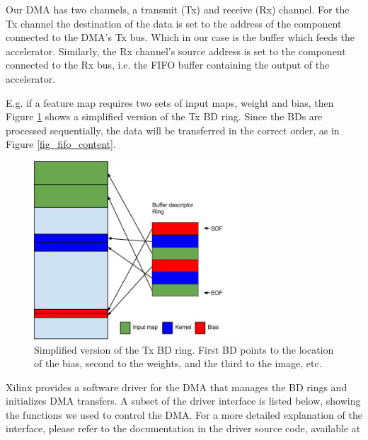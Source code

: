Our DMA has two channels, a transmit (Tx) and receive (Rx) channel. For the Tx channel the destination of the data is set to the address of the component connected to the DMA's Tx bus. Which in our case is the buffer which feeds the accelerator. Similarly, the Rx channel's source address is set to the component connected to the Rx bus, i.e. the FIFO buffer containing the output of the accelerator.

E.g. if a feature map requires two sets of input maps, weight and bias, then Figure \ref{fig_bdring} shows a simplified version of the Tx BD ring. Since the BDs are processed sequentially, the data will be transferred in the correct order, as in Figure \ref{fig_fifo_content}.

\begin{figure}[h!]
  \centering
      \includegraphics[width=0.7\textwidth]{Figures/Method/BdRing}
    \caption[Tx Bd ring]{Simplified version of the Tx BD ring. First BD points to the location of the bias, second to the weights, and the third to the image, etc.}
    \label{fig_bdring}
\end{figure}


Xilinx provides a software driver for the DMA that manages the BD rings and initializes DMA transfers. A subset of the driver interface is listed below, showing the functions we used to control the DMA. For a more detailed explanation of the interface, please refer to the documentation in the driver source code, available at \cite{DMA_DRIVER_SOURCE}


